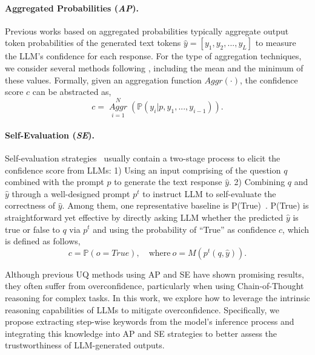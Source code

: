 \documentclass[11pt]{article}
\newcommand{\yhat}{\hat{y}}
\begin{document}
\paragraph{Aggregated Probabilities (\textit{AP}).}
Previous works \citep{kadavath2022language, huang2023look, varshney2023stitch} based on aggregated probabilities typically aggregate output token probabilities of the generated text tokens $\yhat = [y_1, y_2, ..., y_L]$ to measure the LLM's confidence for each response. For the type of aggregation techniques, we consider several methods following \citet{orgad2024llms}, including the mean and the minimum of these values. Formally, given an aggregation function $\textit{Aggr}(\cdot)$, the confidence score $c$ can be abstracted as,
\begin{equation}
\label{eq:1}
    c = \mathop{\textit{Aggr}}\limits_{i=1}^{N}(\mathbb{P}(y_i | p, y_1, ..., y_{i-1})).
\end{equation}

\paragraph{Self-Evaluation (\textit{SE}).}
Self-evaluation strategies~\citep{kadavath2022language, xiong2023can} usually contain a two-stage process to elicit the confidence score from LLMs: 1) Using an input comprising of the question $q$ combined with the prompt $p$ to generate the text response $\yhat$. 2) Combining $q$ and $\yhat$ through a well-designed prompt $p^{t}$ to instruct LLM to self-evaluate the correctness of $\yhat$. Among them, one representative baseline is P(True)~\citep{kadavath2022language}. P(True) is straightforward yet effective by directly asking LLM whether the predicted $\yhat$ is true or false to $q$ via $p^{t}$ and using the probability of “True” as confidence $c$, which is defined as follows,
\begin{equation}
\label{eq:2}
    c = \mathbb{P}(o = \textit{True}), \quad\text{where}\ o = M(p^{t}(q, \yhat)).
\end{equation}

Although previous UQ methods using AP and SE have shown promising results, they often suffer from overconfidence, particularly when using Chain-of-Thought reasoning for complex tasks.  
In this work, we explore how to leverage the intrinsic reasoning capabilities of LLMs to mitigate overconfidence. Specifically, we propose extracting step-wise keywords from the model’s inference process and integrating this knowledge into AP and SE strategies to better assess the trustworthiness of LLM-generated outputs.
\end{document}
